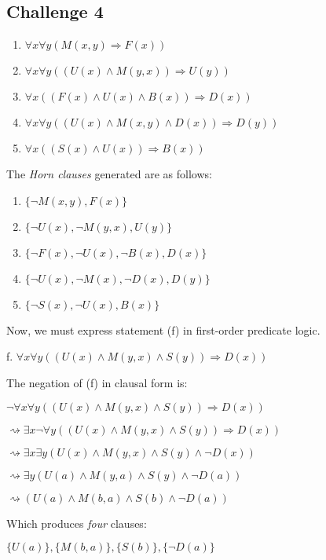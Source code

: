 \documentclass[12pt]{article}
\newcommand{\impl}{\mathbin{\Rightarrow}}
\begin{document}
\subsection*{Challenge 4}
\begin{enumerate}
  \item $\forall x \forall y(M(x,y) \impl F(x))$
  \item $\forall x \forall y((U(x) \land M(y,x)) \impl U(y))$
  \item $\forall x((F(x) \land U(x) \land B(x)) \impl D(x))$
  \item $\forall x \forall y((U(x) \land M(x,y) \land D(x)) \impl D(y))$
  \item $\forall x((S(x) \land U(x)) \impl B(x))$
\end{enumerate}

\bigskip
\noindent
The \emph{Horn clauses} generated are as follows:
\begin{enumerate}
  \item $\{\neg M(x,y), F(x)\}$
  \item $\{\neg U(x), \neg M(y,x), U(y)\}$
  \item $\{\neg F(x), \neg U(x), \neg B(x), D(x)\}$
  \item $\{\neg U(x), \neg M(x), \neg D(x), D(y)\}$
  \item $\{\neg S(x), \neg U(x), B(x)\}$
\end{enumerate}

\bigskip
\noindent
Now, we must express statement (f) in first-order predicate logic.

\bigskip
f.  $\forall x \forall y((U(x) \land M(y,x) \land S(y)) \impl D(x))$

\bigskip
\noindent
The negation of (f) in clausal form is: 

$\neg \forall x \forall y((U(x) \land M(y,x) \land S(y)) \impl D(x))$

$\rightsquigarrow \exists x \neg \forall y((U(x) \land M(y,x) \land S(y)) \impl D(x))$

$\rightsquigarrow \exists x \exists y(U(x) \land M(y,x) \land S(y) \land \neg D(x))$

$\rightsquigarrow \exists y(U(a) \land M(y,a) \land S(y) \land \neg D(a))$

$\rightsquigarrow (U(a) \land M(b,a) \land S(b) \land \neg D(a))$

\bigskip
\noindent
Which produces \emph{four} clauses: 

$\{U(a)\}, \{M(b,a)\}, \{S(b)\}, \{\neg D(a)\}$
\end{document}
